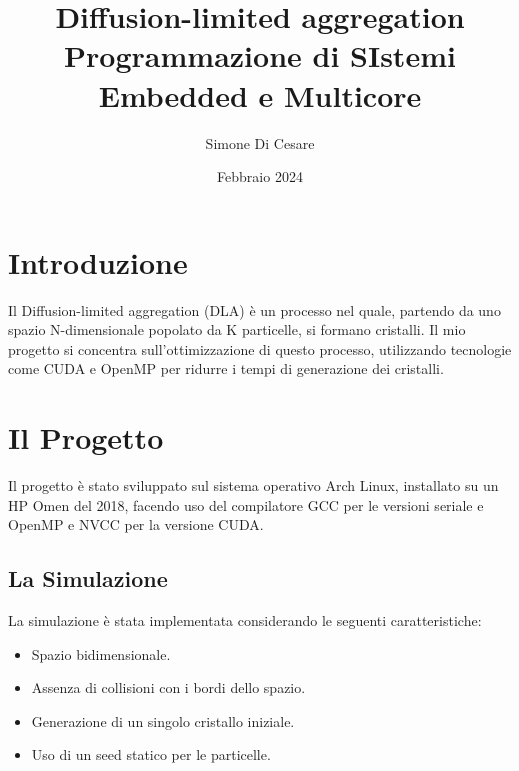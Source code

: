 \documentclass{article}
\title{Diffusion-limited aggregation\\[10pt]
    \large Programmazione di SIstemi Embedded e Multicore}
\author{Simone Di Cesare}
\date{Febbraio 2024}
\begin{document}
\maketitle

\section{Introduzione}
Il Diffusion-limited aggregation (DLA) è un processo nel quale, partendo da uno spazio N-dimensionale popolato da K particelle, si formano cristalli. Il mio progetto si concentra sull'ottimizzazione di questo processo, utilizzando tecnologie come CUDA e OpenMP per ridurre i tempi di generazione dei cristalli.

\section{Il Progetto}
Il progetto è stato sviluppato sul sistema operativo Arch Linux, installato su un HP Omen del 2018, facendo uso del compilatore GCC per le versioni seriale e OpenMP e NVCC per la versione CUDA.
\subsection{La Simulazione}
La simulazione è stata implementata considerando le seguenti caratteristiche:
\begin{itemize}
    \item Spazio bidimensionale.
    \item Assenza di collisioni con i bordi dello spazio.
    \item Generazione di un singolo cristallo iniziale.
    \item Uso di un seed statico per le particelle.
\end{itemize}
\end{document}

